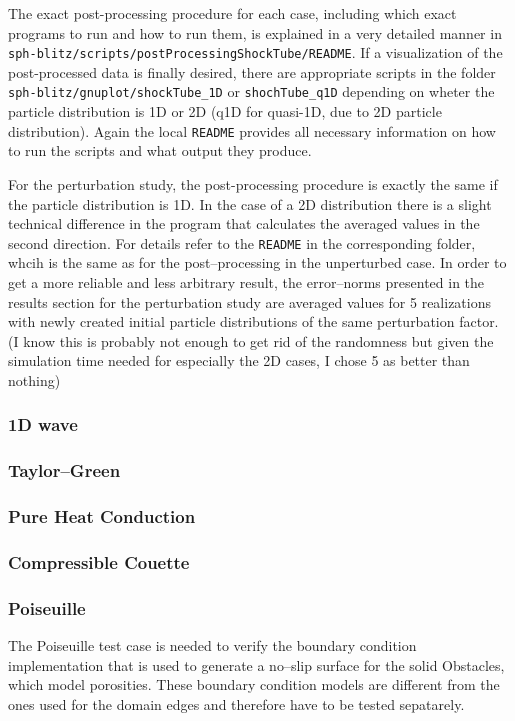 \documentclass{report}
\begin{document}
The exact post-processing procedure for each case, including which exact programs to run and how to run them, is explained in a very detailed manner in {\tt sph-blitz/scripts/postProcessingShockTube/README}. If a visualization of the post-processed data is finally desired, there are appropriate scripts in the folder {\tt sph-blitz/gnuplot/shockTube\_1D} or {\tt shochTube\_q1D} depending on wheter the particle distribution is 1D or 2D (q1D for quasi-1D, due to 2D particle distribution).
Again the local {\tt README} provides all necessary information on how to run the scripts and what output they produce.

For the perturbation study, the post-processing procedure is exactly the same if the particle distribution is 1D. In the case of a 2D distribution there is a slight technical difference in the program that calculates the averaged values in the second direction. For details refer to the {\tt README} in the corresponding folder, whcih is the same as for the post--processing in the unperturbed case.
In order to get a more reliable and less arbitrary result, the error--norms presented in the results section for the perturbation study are averaged values for 5 realizations with newly created initial particle distributions of the same perturbation factor. (I know this is probably not enough to get rid of the randomness but given the simulation time needed for especially the 2D cases, I chose 5 as better than nothing)




\subsubsection{1D wave}
\subsubsection{Taylor--Green}
\subsubsection{Pure Heat Conduction}
\subsubsection{Compressible Couette}
\subsubsection{Poiseuille}
The Poiseuille test case is needed to verify the boundary condition implementation that is used to generate a no--slip surface for the solid Obstacles, which model porosities. These boundary condition models are different from the ones used for the domain edges and therefore have to be tested sepatarely. 
\end{document}
